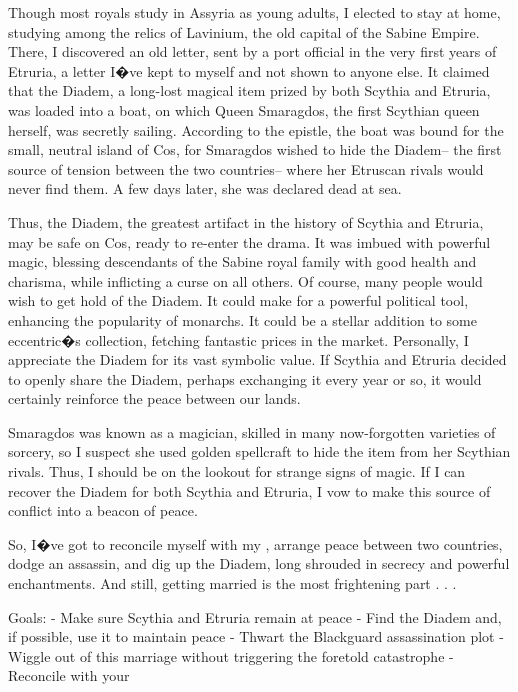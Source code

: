 \documentclass[char]{Kos}
\begin{document}
Though most royals study in Assyria as young adults, I elected to stay at home, studying among the relics of Lavinium, the old capital of the Sabine Empire. There, I discovered an old letter, sent by a port official in the very first years of Etruria, a letter I�ve kept to myself and not shown to anyone else. It claimed that the Diadem, a long-lost magical item prized by both Scythia and Etruria, was loaded into a boat, on which Queen Smaragdos, the first Scythian queen herself, was secretly sailing. According to the epistle, the boat was bound for the small, neutral island of Cos, for Smaragdos wished to hide the Diadem-- the first source of tension between the two countries-- where her Etruscan rivals would never find them. A few days later, she was declared dead at sea.

Thus, the Diadem, the greatest artifact in the history of Scythia and Etruria, may be safe on Cos, ready to re-enter the drama. It was imbued with powerful magic, blessing descendants of the Sabine royal family with good health and charisma, while inflicting a curse on all others. Of course, many people would wish to get hold of the Diadem. It could make for a powerful political tool, enhancing the popularity of monarchs. It could be a stellar addition to some eccentric�s collection, fetching fantastic prices in the market. Personally, I appreciate the Diadem for its vast symbolic value. If Scythia and Etruria decided to openly share the Diadem, perhaps exchanging it every year or so, it would certainly reinforce the peace between our lands.

Smaragdos was known as a magician, skilled in many now-forgotten varieties of sorcery, so I suspect she used golden spellcraft to hide the item from her Scythian rivals. Thus, I should be on the lookout for strange signs of magic. If I can recover the Diadem for both Scythia and Etruria, I vow to make this source of conflict into a beacon of peace. 

So, I�ve got to reconcile myself with my \cPoet{\sibling}, arrange peace between two countries, dodge an assassin, and dig up the Diadem, long shrouded in secrecy and powerful enchantments. And still, getting married is the most frightening part . . .

Goals:
- Make sure Scythia and Etruria remain at peace
- Find the Diadem and, if possible, use it to maintain peace
- Thwart the Blackguard assassination plot 
- Wiggle out of this marriage without triggering the foretold catastrophe
- Reconcile with your \cPoet{\sibling}
\end{document}
